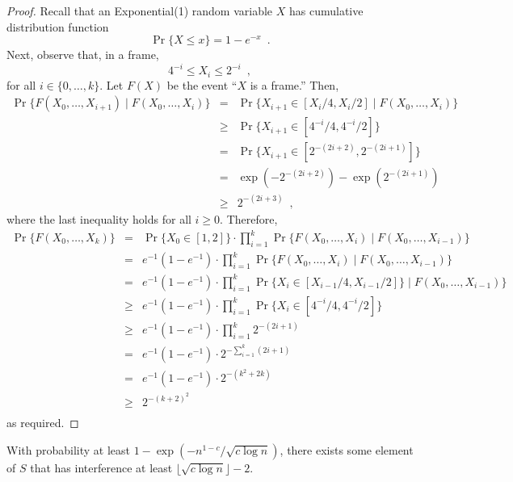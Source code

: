\documentclass{patmorin}
\begin{document}
\begin{proof}
Recall that an Exponential(1) random variable $X$ has cumulative
distribution function
\[
   \Pr\{X \le x\} = 1-e^{-x} \enspace .
\]
Next, observe that, in a frame,
\[
                 4^{-i} \le X_i \le 2^{-i}  \enspace ,
\]
for all $i\in\{0,\ldots,k\}$.  Let $F(X)$ be the event ``$X$ is a frame.''
Then,
\begin{eqnarray*}
     \Pr\{F(X_0,\ldots,X_{i+1}) \mid F(X_0,\ldots,X_{i})\} 
        & = & \Pr\{X_{i+1} \in [X_{i}/4,X_{i}/2] \mid F(X_0,\ldots,X_{i})\} \\
        & \ge & \Pr\{X_{i+1} \in [4^{-i}/4,4^{-i}/2]\} \\
        & = & \Pr\{X_{i+1} \in [2^{-(2i+2)},2^{-(2i+1)}]\} \\
        & = & \exp(-2^{-(2i+2)}) - \exp(2^{-(2i+1)}) \\
        & \ge & 2^{-(2i+3)} \enspace ,
\end{eqnarray*}
where the last inequality holds for all $i\ge 0$.  Therefore,
\begin{eqnarray*}
     \Pr\{F(X_0,\ldots,X_{k})\}
   & = & \Pr\{X_0\in[1,2]\}
         \cdot\prod_{i=1}^k \Pr\{F(X_0,\ldots,X_{i})
                                 \mid F(X_0,\ldots,X_{i-1})\} \\
   & = & e^{-1}(1-e^{-1})
         \cdot\prod_{i=1}^k \Pr\{F(X_0,\ldots,X_{i})
                                 \mid F(X_0,\ldots,X_{i-1})\} \\
   & = & e^{-1}(1-e^{-1})
         \cdot\prod_{i=1}^k \Pr\{X_{i} \in [X_{i-1}/4,X_{i-1}/2]\}
                                 \mid F(X_0,\ldots,X_{i-1})\} \\
   & \ge &  e^{-1}(1-e^{-1})
         \cdot\prod_{i=1}^k \Pr\{X_{i} \in [4^{-i}/4,4^{-i}/2]\} \\
   & \ge & e^{-1}(1-e^{-1})\cdot\prod_{i=1}^k 2^{-(2i+1)} \\
   & = & e^{-1}(1-e^{-1})\cdot2^{-\sum_{i=1}^k(2i+1)} \\
   & = & e^{-1}(1-e^{-1})\cdot2^{-(k^2+2k)} \\
   & \ge  & 2^{-(k+2)^2} \\
\end{eqnarray*}
as required.
\end{proof}


\begin{lem}\label{lower-bound}
With probability at least $1-\exp(-n^{1-c}/\sqrt{c\log n})$, there exists
some element of $S$ that has interference at least $\lfloor\sqrt{c\log
n}\rfloor-2$.
\end{lem}
\end{document}
